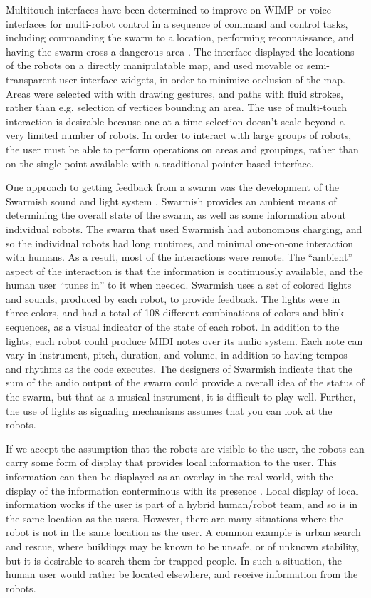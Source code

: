Multitouch interfaces have been determined to improve on WIMP or voice interfaces for multi-robot control in a sequence of command and control tasks, including commanding the swarm to a location, performing reconnaissance, and having the swarm cross a dangerous area \citep{hayes2010multi}.
The interface displayed the locations of the robots on a directly manipulatable map, and used movable or semi-transparent user interface widgets, in order to minimize occlusion of the map. 
Areas were selected with with drawing gestures, and paths with fluid strokes, rather than e.g. selection of vertices bounding an area.
The use of multi-touch interaction is desirable because one-at-a-time selection doesn't scale beyond a very limited number of robots.
In order to interact with large groups of robots, the user must be able to perform operations on areas and groupings, rather than on the single point available with a traditional pointer-based interface. 

One approach to getting feedback from a swarm was the development of the Swarmish sound and light system \citep{mclurkin2006speaking}. 
Swarmish provides an ambient means of determining the overall state of the swarm, as well as some information about individual robots. 
The swarm that used Swarmish had autonomous charging, and so the individual robots had long runtimes, and minimal one-on-one interaction with humans. 
As a result, most of the interactions were remote.
The ``ambient'' aspect of the interaction is that the information is continuously available, and the human user ``tunes in'' to it when needed. 
Swarmish uses a set of colored lights and sounds, produced by each robot, to provide feedback. 
The lights were in three colors, and had a total of 108 different combinations of colors and blink sequences, as a visual indicator of the state of each robot. 
In addition to the lights, each robot could produce MIDI notes over its audio system. 
Each note can vary in instrument, pitch, duration, and volume, in addition to having tempos and rhythms as the code executes. 
The designers of Swarmish indicate that the sum of the audio output of the swarm could provide a overall idea of the status of the swarm, but that as a musical instrument, it is difficult to play well. 
Further, the use of lights as signaling mechanisms assumes that you can look at the robots. 

If we accept the assumption that the robots are visible to the user, the robots can carry some form of display that provides local information to the user. 
This information can then be displayed as an overlay in the real world, with the display of the information conterminous with its presence \citep{Daily:2003:WEI:820752.821587}. 
Local display of local information works if the user is part of a hybrid human/robot team, and so is in the same location as the users. 
However, there are many situations where the robot is not in the same location as the user. 
A common example is urban search and rescue, where buildings may be known to be unsafe, or of unknown stability, but it is desirable to search them for trapped people. 
In such a situation, the human user would rather be located elsewhere, and receive information from the robots. 

